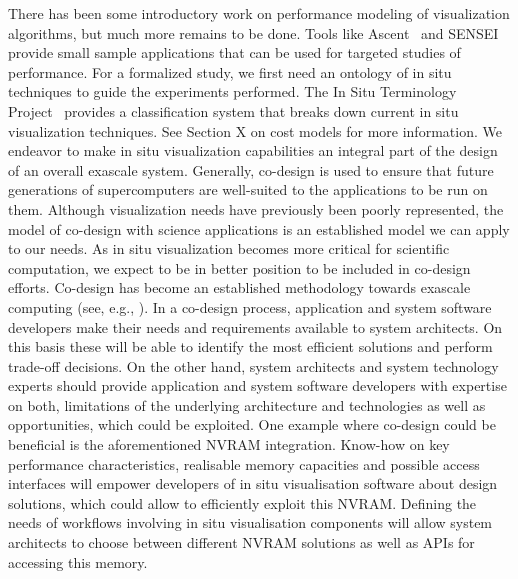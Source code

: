 \begin{refsection}
There has been some introductory work on performance modeling of visualization algorithms, but much more remains to be done. Tools like Ascent~\cite{Larsen17} and SENSEI~\cite{Ayachit16} provide small sample applications that can be used for targeted studies of performance. For a formalized study, we first need an ontology of in situ techniques to guide the experiments performed. The In Situ Terminology Project~\cite{ISTP} provides a classification system that breaks down current in situ visualization techniques. See Section X on cost models for more information.
We endeavor to make in situ visualization capabilities an integral part of the design of an overall exascale system. Generally, co-design is used to ensure that future generations of supercomputers are well-suited to the applications to be run on them. Although visualization needs have previously been poorly represented, the model of co-design with science applications is an established model we can apply to our needs. As in situ visualization becomes more critical for scientific computation, we expect to be in better position to be included in co-design efforts. Co-design has become an established methodology towards exascale computing (see, e.g., \cite{Barrett13}). In a co-design process, application and system software developers make their needs and requirements available to system architects. On this basis these will be able to identify the most efficient solutions and perform trade-off decisions. On the other hand, system architects and system technology experts should provide application and system software developers with expertise on both, limitations of the underlying architecture and technologies as well as opportunities, which could be exploited. 
One example where co-design could be beneficial is the aforementioned NVRAM integration. Know-how on key performance characteristics, realisable memory capacities and possible access interfaces will empower developers of in situ visualisation software about design solutions, which could allow to efficiently exploit this NVRAM. Defining the needs of workflows involving in situ visualisation components will allow system architects to choose between different NVRAM solutions as well as APIs for accessing this memory.


\end{refsection}
